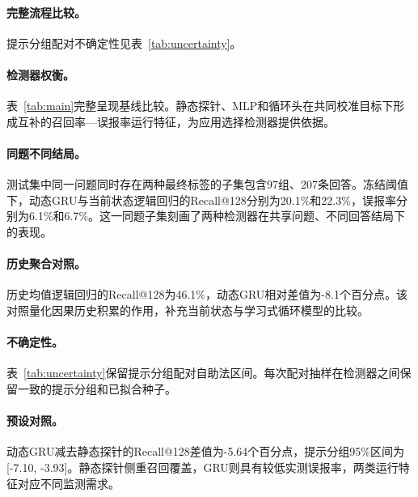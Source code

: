 \paragraph{完整流程比较。}\AchievementDetectionZH{} 提示分组配对不确定性见表~\ref{tab:uncertainty}。



\paragraph{检测器权衡。}表~\ref{tab:main}完整呈现基线比较。静态探针、MLP和循环头在共同校准目标下形成互补的召回率—误报率运行特征，为应用选择检测器提供依据。





\paragraph{同题不同结局。}测试集中同一问题同时存在两种最终标签的子集包含97组、207条回答。冻结阈值下，动态GRU与当前状态逻辑回归的Recall@128分别为20.1\%和22.3\%，误报率分别为6.1\%和6.7\%。这一同题子集刻画了两种检测器在共享问题、不同回答结局下的表现。

\paragraph{历史聚合对照。}历史均值逻辑回归的Recall@128为46.1\%，动态GRU相对差值为-8.1个百分点。该对照量化因果历史积累的作用，补充当前状态与学习式循环模型的比较。

\paragraph{不确定性。}表~\ref{tab:uncertainty}保留提示分组配对自助法区间。每次配对抽样在检测器之间保留一致的提示分组和已拟合种子。

\paragraph{预设对照。}动态GRU减去静态探针的Recall@128差值为-5.64个百分点，提示分组95\%区间为[-7.10, -3.93]。静态探针侧重召回覆盖，GRU则具有较低实测误报率，两类运行特征对应不同监测需求。
